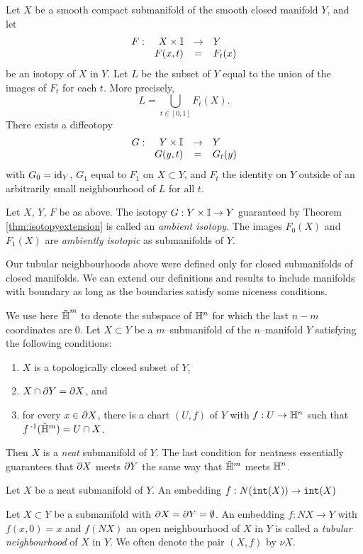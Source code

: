 \begin{theorem}
	\label{thm:isotopyextension}
	Let $X$ be a smooth compact submanifold of the smooth closed manifold $Y$, and let
	\[
		\begin{array}{crcl}
			F: & X\times\mathbb{I} & \to & Y \\
			   & F(x,t) & = & F_t(x)
		\end{array}
	\]
	be an isotopy of $X$ in $Y$.
	Let $L$ be the subset of $Y$ equal to the union of the images of $F_t$ for each $t$.
	More precisely,
	\[
		L = \bigcup_{t\in[0,1]} F_t(X).
	\]
	There exists a diffeotopy 
	\[
		\begin{array}{crcl}
			G: & Y\times\mathbb{I} & \to & Y \\
			   & G(y,t) & = & G_t(y)				
		\end{array}
	\]
	with $G_0=\textrm{id}_{Y}$, $G_1$ equal to $F_1$ on $X\subset Y$, and $F_t$ the identity on $Y$ outside of an arbitrarily small neighbourhood of $L$ for all $t$.
\end{theorem}

\begin{defn}
	\label{def:ambientisotopy}
	Let $X$, $Y$, $F$ be as above.
	The isotopy $G:Y\times\mathbb{I}\to Y$ guaranteed by Theorem \ref{thm:isotopyextension} is called an \emph{ambient isotopy}.
	The images $F_0(X)$ and $F_1(X)$ are \emph{ambiently isotopic} as submanifolds of $Y$.
\end{defn}

Our tubular neighbourhoods above were defined only for closed submanifolds of closed manifolds.
We can extend our definitions and results to include manifolds with boundary as long as the boundaries satisfy some niceness conditions.

\begin{defn}
	We use here $\mathbf{\tilde{\text{$\mathbb{H}$}}}^m$ to denote the subspace of $\mathbb{H}^n$ for which the last $n-m$ coordinates are $0$. 
	Let $X\subset Y$ be a $m$--submanifold of the $n$--manifold $Y$ satisfying the following conditions:
	\begin{enumerate}
		\item $X$ is a topologically closed subset of $Y$,
		\item $X\cap \partial Y=\partial X$, and
		\item for every $x\in\partial X$, there is a chart $(U,f)$ of $Y$ with $f:U\to\mathbb{H}^n$ such that $f^{\,\text{-}1}(\tilde{\mathbb{H}}^m)=U\cap X$.
	\end{enumerate}
	Then $X$ is a \emph{neat} submanifold of $Y$.
	The last condition for neatness essentially guarantees that $\partial X$ meets $\partial Y$ the same way that $\tilde{\mathbb{H}}^m$ meets $\mathbb{H}^n$.
\end{defn}

\begin{defn}
	Let $X$ be a neat submanifold of $Y$.
	An embedding $f:N(\mathtt{int}(X))\to\mathtt{int}(X)$
	
		Let $X\subset Y$ be a submanifold with $\partial X = \partial Y = \emptyset$.
		An embedding $f:NX\to Y$ with $f(x,0)=x$ and $f(NX)$ an open neighbourhood of $X$ in $Y$ is called a \emph{tubular neighbourhood} of $X$ in $Y$.
		We often denote the pair $(X,f)$ by $\nu X$.
	
	
\end{defn}